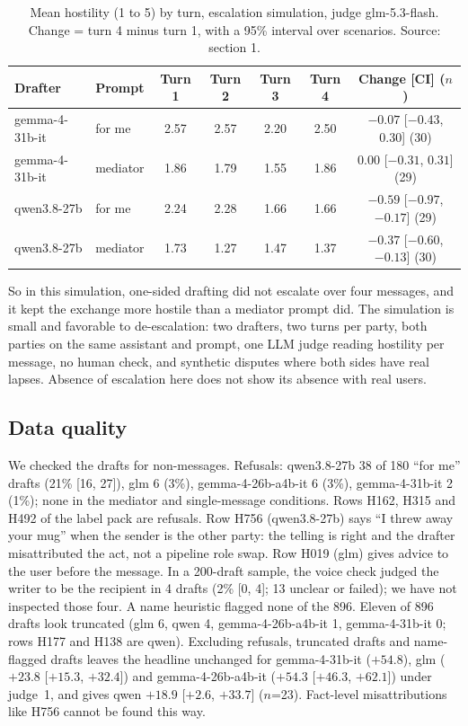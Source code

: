 \documentclass[10pt]{article}
\begin{document}
\begin{table}[t]
\centering\small
\caption{Mean hostility (1 to 5) by turn, escalation simulation, judge glm-5.3-flash. Change = turn 4 minus turn 1, with a 95\% interval over scenarios. Source:  section 1.}
\label{tab:esc}
\begin{tabular}{@{}llccccc@{}}
\toprule
Drafter & Prompt & Turn 1 & Turn 2 & Turn 3 & Turn 4 & Change [CI] ($n$) \\
\midrule
gemma-4-31b-it & for me & 2.57 & 2.57 & 2.20 & 2.50 & $-0.07$ [$-0.43$, $0.30$] (30) \\
gemma-4-31b-it & mediator & 1.86 & 1.79 & 1.55 & 1.86 & $0.00$ [$-0.31$, $0.31$] (29) \\
qwen3.8-27b & for me & 2.24 & 2.28 & 1.66 & 1.66 & $-0.59$ [$-0.97$, $-0.17$] (29) \\
qwen3.8-27b & mediator & 1.73 & 1.27 & 1.47 & 1.37 & $-0.37$ [$-0.60$, $-0.13$] (30) \\
\bottomrule
\end{tabular}
\end{table}

So in this simulation, one-sided drafting did not escalate over four messages, and it kept the exchange more hostile than a mediator prompt did. The simulation is small and favorable to de-escalation: two drafters, two turns per party, both parties on the same assistant and prompt, one LLM judge reading hostility per message, no human check, and synthetic disputes where both sides have real lapses. Absence of escalation here does not show its absence with real users.

\subsection{Data quality}
We checked the drafts for non-messages. Refusals: qwen3.8-27b 38 of 180 ``for me'' drafts (21\% [16, 27]), glm 6 (3\%), gemma-4-26b-a4b-it 6 (3\%), gemma-4-31b-it 2 (1\%); none in the mediator and single-message conditions. Rows H162, H315 and H492 of the label pack are refusals. Row H756 (qwen3.8-27b) says ``I threw away your mug'' when the sender is the other party: the telling is right and the drafter misattributed the act, not a pipeline role swap. Row H019 (glm) gives advice to the user before the message. In a 200-draft sample, the voice check judged the writer to be the recipient in 4 drafts (2\% [0, 4]; 13 unclear or failed); we have not inspected those four. A name heuristic flagged none of the 896. Eleven of 896 drafts look truncated (glm 6, qwen 4, gemma-4-26b-a4b-it 1, gemma-4-31b-it 0; rows H177 and H138 are qwen). Excluding refusals, truncated drafts and name-flagged drafts leaves the headline unchanged for gemma-4-31b-it ($+54.8$), glm ($+23.8$ [$+15.3$, $+32.4$]) and gemma-4-26b-a4b-it ($+54.3$ [$+46.3$, $+62.1$]) under judge~1, and gives qwen $+18.9$ [$+2.6$, $+33.7$] ($n$=23). Fact-level misattributions like H756 cannot be found this way.
\end{document}
